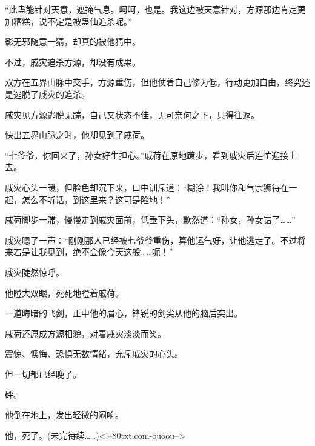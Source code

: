 \begin{this_body}
“此蛊能针对天意，遮掩气息。呵呵，也是。我这边被天意针对，方源那边肯定更加糟糕，说不定是被蛊仙追杀呢。”

影无邪随意一猜，却真的被他猜中。

不过，戚灾追杀方源，却没有成果。

双方在五界山脉中交手，方源重伤，但他仗着自己修为低，行动更加自由，终究还是逃脱了戚灾的追杀。

戚灾见方源逃脱无踪，自己又状态不佳，无可奈何之下，只得往返。

快出五界山脉之时，他却见到了戚荷。

“七爷爷，你回来了，孙女好生担心。”戚荷在原地踱步，看到戚灾后连忙迎接上去。

戚灾心头一暖，但脸色却沉下来，口中训斥道：“糊涂！我叫你和气宗狮待在一起，怎么不听话，到这里来？这可是险地！”

戚荷脚步一滞，慢慢走到戚灾面前，低垂下头，歉然道：“孙女，孙女错了……”

戚灾嗯了一声：“刚刚那人已经被七爷爷重伤，算他运气好，让他逃走了。不过将来若是让我见到，绝不会像今天这般……呃！”

戚灾陡然惊呼。

他瞪大双眼，死死地瞪着戚荷。

一道晦暗的飞剑，正中他的眉心，锋锐的剑尖从他的脑后突出。

戚荷还原成方源相貌，对着戚灾淡淡而笑。

震惊、懊悔、恐惧无数情绪，充斥戚灾的心头。

但一切都已经晚了。

砰。

他倒在地上，发出轻微的闷响。

他，死了。(未完待续……)<!--80txt.com-ouoou-->

\end{this_body}

